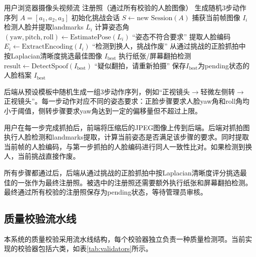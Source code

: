 \begin{algorithm}[htbp]
    \caption{动作挑战流程}
    \label{alg:challenge}
    \begin{algorithmic}[1]
        \Require 用户浏览器摄像头视频流
        \Ensure 注册照（通过所有校验的人脸图像）
        \State 生成随机3步动作序列 $A = [a_1, a_2, a_3]$ 
        \State 初始化挑战会话 $S \leftarrow \text{new Session}(A)$
            \State 捕获当前帧图像 $I_i$
            \State 检测人脸并提取landmarks $L_i$
            \State 计算姿态角 $(\text{yaw}, \text{pitch}, \text{roll}) \leftarrow \text{EstimatePose}(L_i)$
                \State \Return ``姿态不符合要求''
            \EndIf
            \State 提取人脸编码 $E_i \leftarrow \text{ExtractEncoding}(I_i)$
                \State \Return ``检测到换人，挑战作废''
            \EndIf
        \EndFor
        \State 从通过挑战的正脸抓拍中按Laplacian清晰度挑选最佳图像 $I_{\text{best}}$
        \State 执行纸张/屏幕翻拍检测 $\text{result} \leftarrow \text{DetectSpoof}(I_{\text{best}})$
            \State \Return ``疑似翻拍，请重新拍摄''
        \EndIf
        \State 保存$ I_{\text{best}} $为pending状态的人脸档案
        \State \Return $I_{\text{best}}$
    \end{algorithmic}
\end{algorithm}

后端从预设模板中随机生成一组3步动作序列，例如``正视镜头$\to$轻微左侧转$\to$正视镜头''。每一步动作对应不同的姿态要求：正脸步骤要求人脸yaw角和roll角均小于阈值，侧转步骤要求yaw角达到一定的偏移量但不超过上限。

用户在每一步完成抓拍后，前端将压缩后的JPEG图像上传到后端。后端对抓拍图执行人脸检测和landmarks提取，计算当前姿态是否满足该步骤的要求。同时提取当前帧的人脸编码，与第一步抓拍的人脸编码进行同人一致性比对。如果检测到换人，当前挑战直接作废。

所有步骤都通过后，后端从通过挑战的正脸抓拍中按Laplacian清晰度评分挑选最佳的一张作为最终注册照。被选中的注册照还需要额外执行纸张和屏幕翻拍检测。最终通过所有校验的注册照保存为pending状态，等待管理员审核。

\subsection{质量校验流水线}

本系统的质量校验采用流水线结构，每个校验器独立负责一种质量检测项。当前实现的校验器包括六类，如表\ref{tab:validators}所示。

